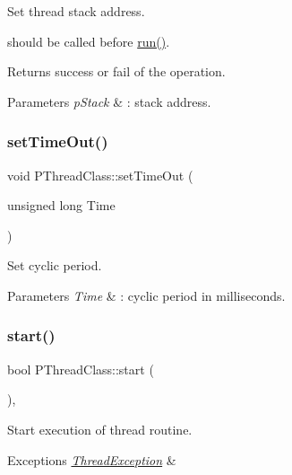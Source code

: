 Set thread stack address.

should be called before \hyperlink{classPThreadClass_a9e60b014b8e8ba6892cc322b6ba183d8}{run()}. \begin{DoxyReturn}{Returns}
success or fail of the operation. 
\end{DoxyReturn}

\begin{DoxyParams}{Parameters}
{\em p\+Stack} & \+: stack address. \\
\hline
\end{DoxyParams}
\mbox{\label{classPThreadClass_a88cda74fba292ade7054204a6833e8ac}} 
\subsubsection{\texorpdfstring{set\+Time\+Out()}{setTimeOut()}}
{\footnotesize\ttfamily void P\+Thread\+Class\+::set\+Time\+Out (\begin{DoxyParamCaption}\item[{unsigned long}]{Time }\end{DoxyParamCaption})\hspace{0.3cm}{\ttfamily [inline]}}

Set cyclic period. 
\begin{DoxyParams}{Parameters}
{\em Time} & \+: cyclic period in milliseconds. \\
\hline
\end{DoxyParams}
\mbox{\label{classPThreadClass_a94862a3179469348fd89aefe9dac8244}} 
\subsubsection{\texorpdfstring{start()}{start()}}
{\footnotesize\ttfamily bool P\+Thread\+Class\+::start (\begin{DoxyParamCaption}{ }\end{DoxyParamCaption})\hspace{0.3cm}{\ttfamily [virtual]}, {\ttfamily [noexcept]}}

Start execution of thread routine. 
\begin{DoxyExceptions}{Exceptions}
{\em \hyperlink{classThreadException}{Thread\+Exception}} & \\
\hline
\end{DoxyExceptions}
\mbox{\label{classPThreadClass_a71e308a0324c76e20c504c037a3e7652}} 
